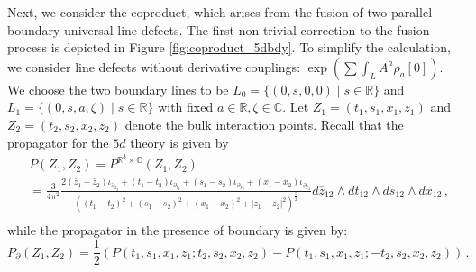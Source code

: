 \documentclass[11pt]{article}
\newcommand{\C}{\mathbb{C}}
\newcommand{\R}{\mathbb{R}}
\numberwithin{equation}{section}
\begin{document}
Next, we consider the coproduct, which arises from the fusion of two parallel boundary universal line defects. The first non-trivial correction to the fusion process is depicted in Figure \ref{fig:coproduct_5dbdy}. To simplify the calculation, we consider line defects without derivative couplings: $\exp(\sum \int_{L} A^a \rho_a[0])$. We choose the two boundary lines to be $L_0 = \{(0,s,0,0)\mid s \in \R\}$ and $L_1 = \{(0,s,a,\zeta)\mid s \in \R\}$ with fixed $a \in \R,\zeta \in \C$. Let $Z_1 = (t_1,s_1,x_1,z_1)$ and $Z_2 = (t_2,s_2,x_2,z_2)$ denote the bulk interaction points. Recall that the propagator for the $5d$ theory is given by
\begin{equation}
\begin{aligned}
		&P(Z_1,Z_2) = P^{\R^{3}\times \C}(Z_1,Z_2)\\
		& = \frac{3}{4\pi^{2}} \frac{2(\bar{z}_1 - \bar{z}_2)\iota_{\partial_{\bar{z}_2}} + (t_1 - t_2)\iota_{\partial_{t_2}}+ (s_1 - s_2)\iota_{\partial_{s_2}} + (x_1 - x_2)\iota_{\partial_{x_2}}}{((t_1-t_2)^2 + (s_1 - s_2)^2 + (x_1 - x_2)^2 + |z_1 - z_2|^2)^{\frac{5}{2}}} d\bar{z}_{12}\wedge dt_{12}\wedge ds_{12} \wedge dx_{12}\,, \\
\end{aligned}
\end{equation} 
while the propagator in the presence of boundary is given by:
\begin{equation}
	P_{\partial}(Z_1,Z_2) = \frac{1}{2}(P(t_1,s_1,x_1,z_1;t_2,s_2,x_2,z_2) - P(t_1,s_1,x_1,z_1;-t_2,s_2,x_2,z_2))\,. 
\end{equation} 
\end{document}
